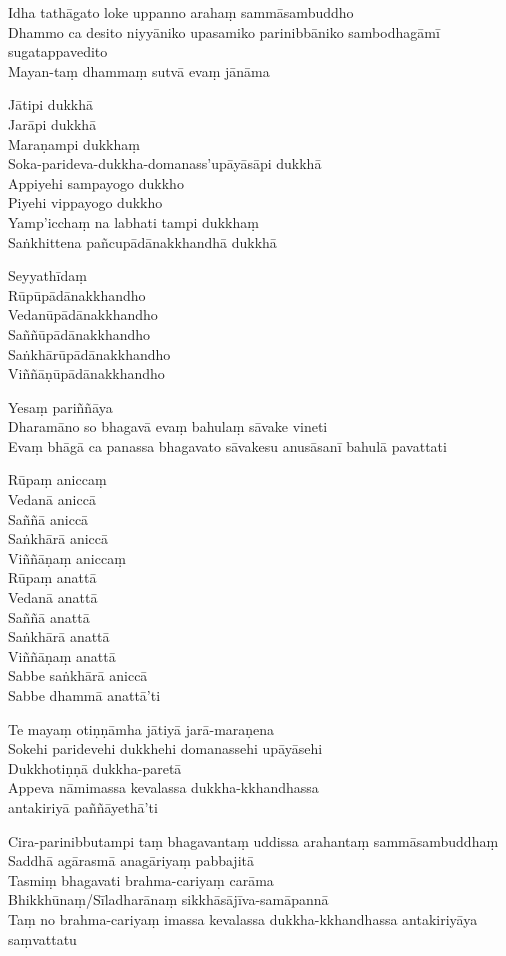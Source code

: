 Idha tathāgato loke uppanno arahaṃ sammāsambuddho\\
Dhammo ca desito niyyāniko upasamiko parinibbāniko sambodhagāmī sugatappavedito\\
Mayan-taṃ dhammaṃ sutvā evaṃ jānāma

Jātipi dukkhā\\
Jarāpi dukkhā\\
Maraṇampi dukkhaṃ\\
Soka-parideva-dukkha-domanass'upāyāsāpi dukkhā\\
Appiyehi sampayogo dukkho\\
Piyehi vippayogo dukkho\\
Yamp'icchaṃ na labhati tampi dukkhaṃ\\
Saṅkhittena pañcupādānakkhandhā dukkhā

Seyyathīdaṃ\\
Rūpūpādānakkhandho\\
Vedanūpādānakkhandho\\
Saññūpādānakkhandho\\
Saṅkhārūpādānakkhandho\\
Viññāṇūpādānakkhandho

Yesaṃ pariññāya\\
Dharamāno so bhagavā evaṃ bahulaṃ sāvake vineti\\
Evaṃ bhāgā ca panassa bhagavato sāvakesu anusāsanī bahulā pavattati

Rūpaṃ aniccaṃ\\
Vedanā aniccā\\
Saññā aniccā\\
Saṅkhārā aniccā\\
Viññāṇaṃ aniccaṃ\\
Rūpaṃ anattā\\
Vedanā anattā\\
Saññā anattā\\
Saṅkhārā anattā\\
Viññāṇaṃ anattā\\
Sabbe saṅkhārā aniccā\\
Sabbe dhammā anattā'ti

Te mayaṃ otiṇṇāmha jātiyā jarā-maraṇena\\
Sokehi paridevehi dukkhehi domanassehi upāyāsehi\\
Dukkhotiṇṇā dukkha-paretā\\
Appeva nāmimassa kevalassa dukkha-kkhandhassa\\
antakiriyā paññāyethā'ti

Cira-parinibbutampi taṃ bhagavantaṃ uddissa arahantaṃ sammāsambuddhaṃ\\
Saddhā agārasmā anagāriyaṃ pabbajitā\\
Tasmiṃ bhagavati brahma-cariyaṃ carāma\\
Bhikkhūnaṃ/Sīladharānaṃ sikkhāsājīva-samāpannā\\
Taṃ no brahma-cariyaṃ imassa kevalassa dukkha-kkhandhassa antakiriyāya saṃvattatu

